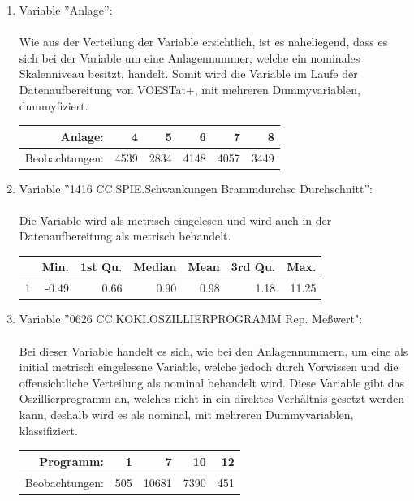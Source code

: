 \documentclass[12pt,titlepage,oneside]{book}
\begin{document}
\begin{enumerate}
    \item Variable ''Anlage'':\\ \\
    Wie aus der Verteilung der Variable ersichtlich, ist es naheliegend, dass es sich bei der Variable um eine Anlagennummer, welche ein nominales Skalenniveau besitzt, handelt. Somit wird die Variable im Laufe der Datenaufbereitung von VOESTat+, mit mehreren Dummyvariablen, dummyfiziert.
        \begin{table}[ht]
        \centering
        \begin{tabular}{rrrrrr}
          \hline
         Anlage: & 4 & 5 & 6 & 7 & 8 \\
          \hline
         Beobachtungen: & 4539 & 2834 & 4148 & 4057 & 3449 \\
           \hline
        \end{tabular}
        \end{table}
    \item Variable ''1416 CC.SPIE.Schwankungen Brammdurchsc Durchschnitt'':\\ \\
    Die Variable wird als metrisch eingelesen und wird auch in der Datenaufbereitung als metrisch behandelt.
        \begin{table}[ht]
        \centering
        \begin{tabular}{rrrrrrr}
          \hline
         & Min. & 1st Qu. & Median & Mean & 3rd Qu. & Max. \\ 
          \hline
        1 & -0.49 & 0.66 & 0.90 & 0.98 & 1.18 & 11.25 \\ 
           \hline
        \end{tabular}
        \end{table}
    \item Variable ''0626 CC.KOKI.OSZILLIERPROGRAMM Rep. Meßwert":\\ \\
    Bei dieser Variable handelt es sich, wie bei den Anlagennummern, um eine als initial metrisch eingelesene Variable, welche jedoch durch Vorwissen und die offensichtliche Verteilung als nominal behandelt wird. Diese Variable gibt das Oszillierprogramm an, welches nicht in ein direktes Verhältnis gesetzt werden kann, deshalb wird es als nominal, mit mehreren Dummyvariablen, klassifiziert.
        \begin{table}[ht]
        \centering
        \begin{tabular}{rrrrr}
          \hline
         Programm: & 1 & 7 & 10 & 12 \\
          \hline
         Beobachtungen: & 505 & 10681 & 7390 & 451 \\
           \hline
        \end{tabular}
        \end{table}
\end{enumerate}
\end{document}
